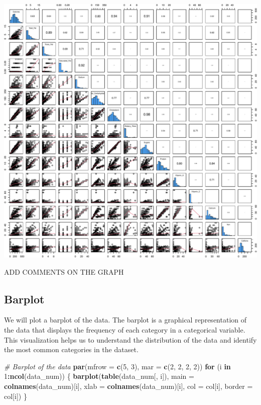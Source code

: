 \documentclass[
]{article}
\newenvironment{Shaded}{\begin{snugshade}}{\end{snugshade}}
\newcommand{\AttributeTok}[1]{\textcolor[rgb]{0.13,0.29,0.53}{#1}}
\newcommand{\CommentTok}[1]{\textcolor[rgb]{0.56,0.35,0.01}{\textit{#1}}}
\newcommand{\ControlFlowTok}[1]{\textcolor[rgb]{0.13,0.29,0.53}{\textbf{#1}}}
\newcommand{\DecValTok}[1]{\textcolor[rgb]{0.00,0.00,0.81}{#1}}
\newcommand{\FunctionTok}[1]{\textcolor[rgb]{0.13,0.29,0.53}{\textbf{#1}}}
\newcommand{\NormalTok}[1]{#1}
\newcommand{\SpecialCharTok}[1]{\textcolor[rgb]{0.81,0.36,0.00}{\textbf{#1}}}
\begin{document}
\begin{center}\includegraphics{Statistical_Learning_Final_Report_files/figure-latex/pairplot-1} \end{center}

ADD COMMENTS ON THE GRAPH

\subsection{Barplot}\label{barplot}

We will plot a barplot of the data. The barplot is a graphical
representation of the data that displays the frequency of each category
in a categorical variable. This visualization helps us to understand the
distribution of the data and identify the most common categories in the
dataset.

\begin{Shaded}
\begin{Highlighting}[]
\CommentTok{\# Barplot of the data}
\FunctionTok{par}\NormalTok{(}\AttributeTok{mfrow =} \FunctionTok{c}\NormalTok{(}\DecValTok{5}\NormalTok{, }\DecValTok{3}\NormalTok{), }\AttributeTok{mar =} \FunctionTok{c}\NormalTok{(}\DecValTok{2}\NormalTok{, }\DecValTok{2}\NormalTok{, }\DecValTok{2}\NormalTok{, }\DecValTok{2}\NormalTok{))}
\ControlFlowTok{for}\NormalTok{ (i }\ControlFlowTok{in} \DecValTok{1}\SpecialCharTok{:}\FunctionTok{ncol}\NormalTok{(data\_num)) \{}
  \FunctionTok{barplot}\NormalTok{(}\FunctionTok{table}\NormalTok{(data\_num[, i]), }\AttributeTok{main =} \FunctionTok{colnames}\NormalTok{(data\_num)[i],}
          \AttributeTok{xlab =} \FunctionTok{colnames}\NormalTok{(data\_num)[i], }\AttributeTok{col =}\NormalTok{ col[i], }\AttributeTok{border =}\NormalTok{ col[i])}
\NormalTok{\}}
\end{Highlighting}
\end{Shaded}
\end{document}

